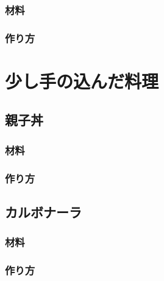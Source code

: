 \documentclass[a4j,oneside,openany]{jsbook}
\begin{document}
\subsection{材料}
\subsection{作り方}

\chapter{少し手の込んだ料理}
\section{親子丼}
\subsection{材料}
\subsection{作り方}
\section{カルボナーラ}
\subsection{材料}
\subsection{作り方}
\end{document}
